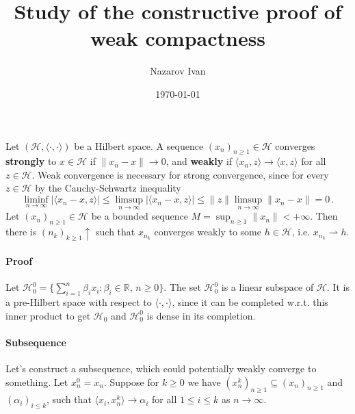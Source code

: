\documentclass[a4paper]{article}
\title{Study of the constructive proof of weak compactness}
\author{Nazarov Ivan}
\date{\today}
\newcommand{\Hcal}{\mathcal{H}}
\newcommand{\real}{\mathbb{R}}
\begin{document}
\maketitle

Let $(\Hcal, \langle\cdot,\cdot\rangle)$ be a Hilbert space. A sequence $(x_n)_{n\geq1} 
\in \Hcal$ converges {\bf strongly} to $x\in\Hcal$ if $\|x_n - x\| \to 0$, and {\bf
weakly} if $\langle x_n, z \rangle \to \langle x, z\rangle$ for all $z\in \Hcal$.
Weak convergence is necessary for strong convergence, since for every $z\in \Hcal$
by the Cauchy-Schwartz inequality
\begin{equation*}
  \liminf_{n\to \infty}
    \lvert \langle x_n - x, z\rangle \rvert
    \leq \limsup_{n\to \infty}
      \lvert \langle x_n - x, z\rangle \rvert
    \leq \|z\| \limsup_{n\to \infty} \|x_n - x \|
    = 0
    \,.
\end{equation*}
Let $(x_n)_{n\geq1} \in \Hcal$ be a bounded sequence $M = \sup_{n\geq1} \|x_n\| < +\infty$.
Then there is $(n_k)_{k\geq1}\uparrow$ such that $x_{n_k}$ converges weakly to some
$h \in \Hcal$, i.e. $x_{n_k}\rightharpoonup h$.

\paragraph{Proof} %
\label{par:proof}

Let $\Hcal^0_0 = \{\sum_{i=1}^n \beta_i x_i \colon \beta_i \in \real,\,n\geq 0 \}$.
The set $\Hcal^0_0$ is a linear subspace of $\Hcal$. It is a pre-Hilbert space with
respect to $\langle\cdot, \cdot \rangle$, since it can be completed w.r.t. this inner
product to get $\Hcal_0$ and $\Hcal^0_0$ is dense in its completion.

\paragraph{Subsequence} %
\label{par:subsequence}

Let's construct a subsequence, which could potentially weakly converge to something.
Let $x^0_n = x_n$. Suppose for $k\geq 0$ we have $(x^k_n)_{n\geq 1} \subseteq (x_n)_{n\geq 1}$
and $(\alpha_i)_{i\leq k}$, such that $\langle x_i, x^k_n\rangle \to \alpha_i$ for
all $1\leq i\leq k$ as $n\to \infty$.
\end{document}
